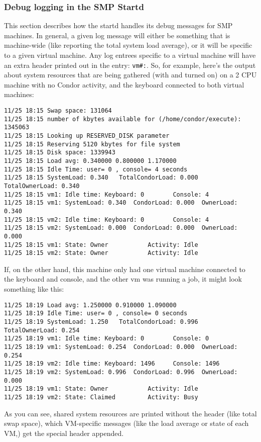 \subsubsection{\label{sec:SMP-logging}
Debug logging in the SMP Startd}

This section describes how the startd handles its debug messages for
SMP machines.
In general, a given log message will either be something that is
machine-wide (like reporting the total system load average), or it
will be specific to a given virtual machine.
Any log entrees specific to a virtual machine will have an extra
header printed out in the entry: \texttt{vm\#:}.  
So, for example, here's the output about system resources that are
being gathered (with  and  turned on) on
a 2 CPU machine with no Condor activity, and the keyboard connected to
both virtual machines:
\begin{verbatim}
11/25 18:15 Swap space: 131064
11/25 18:15 number of kbytes available for (/home/condor/execute): 1345063
11/25 18:15 Looking up RESERVED_DISK parameter
11/25 18:15 Reserving 5120 kbytes for file system
11/25 18:15 Disk space: 1339943
11/25 18:15 Load avg: 0.340000 0.800000 1.170000
11/25 18:15 Idle Time: user= 0 , console= 4 seconds
11/25 18:15 SystemLoad: 0.340   TotalCondorLoad: 0.000  TotalOwnerLoad: 0.340
11/25 18:15 vm1: Idle time: Keyboard: 0        Console: 4
11/25 18:15 vm1: SystemLoad: 0.340  CondorLoad: 0.000  OwnerLoad: 0.340
11/25 18:15 vm2: Idle time: Keyboard: 0        Console: 4
11/25 18:15 vm2: SystemLoad: 0.000  CondorLoad: 0.000  OwnerLoad: 0.000
11/25 18:15 vm1: State: Owner           Activity: Idle
11/25 18:15 vm2: State: Owner           Activity: Idle
\end{verbatim}

If, on the other hand, this machine only had one virtual machine
connected to the keyboard and console, and the other vm was running a
job, it might look something like this:
\begin{verbatim}
11/25 18:19 Load avg: 1.250000 0.910000 1.090000
11/25 18:19 Idle Time: user= 0 , console= 0 seconds
11/25 18:19 SystemLoad: 1.250   TotalCondorLoad: 0.996  TotalOwnerLoad: 0.254
11/25 18:19 vm1: Idle time: Keyboard: 0        Console: 0
11/25 18:19 vm1: SystemLoad: 0.254  CondorLoad: 0.000  OwnerLoad: 0.254
11/25 18:19 vm2: Idle time: Keyboard: 1496     Console: 1496
11/25 18:19 vm2: SystemLoad: 0.996  CondorLoad: 0.996  OwnerLoad: 0.000
11/25 18:19 vm1: State: Owner           Activity: Idle
11/25 18:19 vm2: State: Claimed         Activity: Busy
\end{verbatim}

As you can see, shared system resources are printed without the header
(like total swap space), which VM-specific messages (like the load
average or state of each VM,) get the special header appended.  
